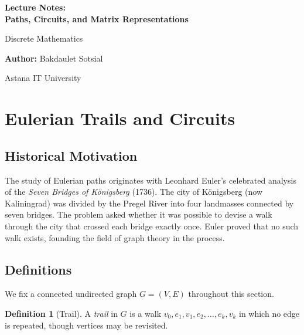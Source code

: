 \documentclass[12pt,a4paper]{article}
\theoremstyle{definition}
\newtheorem{definition}{Definition}[section]
\theoremstyle{plain}
\theoremstyle{remark}
\begin{document}
\begin{titlepage}
    \centering
    \vspace*{4cm}
    
    {\Huge\bfseries Lecture Notes:\\ Paths, Circuits,
and Matrix Representations\par}
    \vspace{1cm}
    {\Large Discrete Mathematics\par}
    \vspace{2cm}
    {\large \textbf{Author:} Bakdaulet Sotsial\par}
    \vspace{1cm}
    
    \vfill
    {\small Astana IT University \par}
    \vspace*{2cm}
\end{titlepage}

\tableofcontents
\newpage

\section{Eulerian Trails and Circuits}
\label{sec:eulerian}

\subsection{Historical Motivation}

The study of Eulerian paths originates with Leonhard Euler's celebrated analysis of the
\emph{Seven Bridges of K\"onigsberg} (1736). The city of K\"onigsberg (now Kaliningrad)
was divided by the Pregel River into four landmasses connected by seven bridges. The
problem asked whether it was possible to devise a walk through the city that crossed each
bridge exactly once. Euler proved that no such walk exists, founding the field of graph
theory in the process.

\subsection{Definitions}

We fix a connected undirected graph $G = (V, E)$ throughout this section.

\begin{definition}[Trail]\label{def:trail}
A \emph{trail} in $G$ is a walk $v_0, e_1, v_1, e_2, \ldots, e_k, v_k$ in which no
edge is repeated, though vertices may be revisited.
\end{definition}
\end{document}
